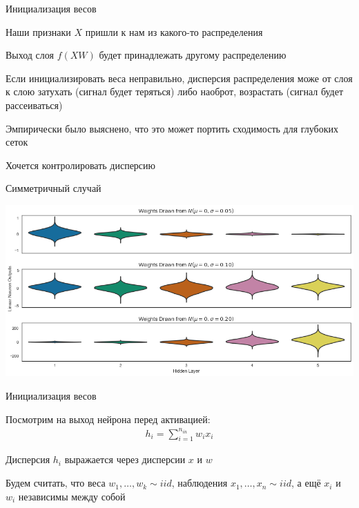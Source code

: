 \documentclass[notes,12pt, aspectratio=169]{beamer}
\newenvironment{wideitemize}{\itemize\addtolength{\itemsep}{10pt}}{\enditemize}
\begin{document}
\begin{frame}{Инициализация весов}
	\begin{wideitemize}
		\item Наши признаки $X$ пришли к нам из какого-то распределения 
		\item Выход слоя $f(XW)$ будет принадлежать другому распределению 
		\item Если инициализировать веса неправильно, дисперсия распределения може от слоя к слою затухать (сигнал будет теряться) либо наоброт, возрастать (сигнал будет рассеиваться)
		\item Эмпирически было выяснено, что это может портить сходимость для глубоких сеток
		\item  \alert{Хочется контролировать дисперсию} 
	\end{wideitemize}
\end{frame}


\begin{frame}{Симметричный случай}
\begin{center}
	\includegraphics[width=.9\linewidth]{init_sim.png}
\end{center}
\end{frame}


\begin{frame}{Инициализация весов}
\begin{wideitemize}
\item  Посмотрим на выход нейрона перед активацией:
	\begin{equation*}
	\begin{aligned} 
	h_i =  \sum_{i=1}^{n_{in}} w_i x_i 
	\end{aligned}
	\end{equation*}
	
\item  Дисперсия $h_i$ выражается через дисперсии $x$ и $w$ 

\item Будем считать, что веса $w_1, \ldots, w_k \sim iid$,  наблюдения $x_1, \ldots, x_n \sim iid$, а ещё $x_i$ и $w_i$ независимы между собой
\end{wideitemize}
\end{frame}
\end{document}
